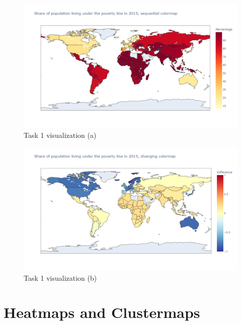 \documentclass[11pt,a4paper,titlepage]{article}
\begin{document}
\begin{figure}[h]
    \centering
    \includegraphics[width=1.0\linewidth]{reports/assignment-3/imgs/task1-1.png}
    \caption{Task 1 visualization (a)}
    \label{fig:viz1}
\end{figure}

\begin{figure}[h]
    \centering
    \includegraphics[width=1.0\linewidth]{reports/assignment-3/imgs/task1-2.png}
    \caption{Task 1 visualization (b)}
    \label{fig:viz2}
\end{figure}

\section{Heatmaps and Clustermaps}


\end{document}
